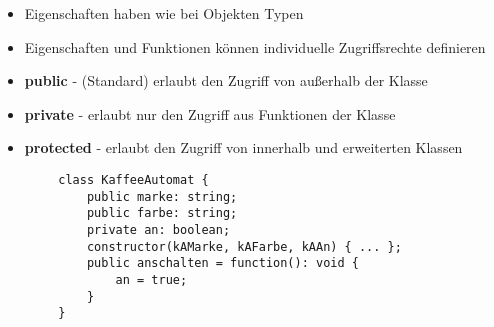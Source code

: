 \documentclass[10pt]{article}
\begin{document}
    \begin{tcolorbox}[
    colback=Orange!5!white,
    colframe=Orange!75!black,
    title={\centering Klassen in TypeScript}]
    \begin{itemize}
        \item Eigenschaften haben wie bei Objekten Typen
        \item Eigenschaften und Funktionen können individuelle Zugriffsrechte definieren
        \item \textbf{public} - (Standard) erlaubt den Zugriff von außerhalb der Klasse
        \item \textbf{private} - erlaubt nur den Zugriff aus Funktionen der Klasse
        \item \textbf{protected} - erlaubt den Zugriff von innerhalb und erweiterten Klassen
    \end{itemize}
    \begin{lstlisting}
        class KaffeeAutomat {
            public marke: string;
            public farbe: string;
            private an: boolean;
            constructor(kAMarke, kAFarbe, kAAn) { ... };
            public anschalten = function(): void {
                an = true;
            }
        }
    \end{lstlisting}
    \end{tcolorbox}
\end{document}
